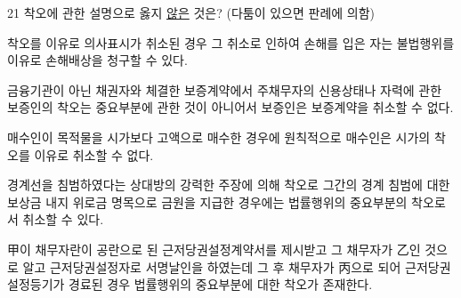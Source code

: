 \begin{question}{21}
착오에 관한 설명으로 옳지 \uline{않은} 것은? (다툼이 있으면 판례에 의함)
\begin{choices}
  \item 착오를 이유로 의사표시가 취소된 경우 그 취소로 인하여 손해를 입은 자는 불법행위를 이유로 손해배상을 청구할 수 있다.
  \item 금융기관이 아닌 채권자와 체결한 보증계약에서 주채무자의 신용상태나 자력에 관한 보증인의 착오는 중요부분에 관한 것이 아니어서 보증인은 보증계약을 취소할 수 없다.
  \item 매수인이 목적물을 시가보다 고액으로 매수한 경우에 원칙적으로 매수인은 시가의 착오를 이유로 취소할 수 없다.
  \item 경계선을 침범하였다는 상대방의 강력한 주장에 의해 착오로 그간의 경계 침범에 대한 보상금 내지 위로금 명목으로 금원을 지급한 경우에는 법률행위의 중요부분의 착오로서 취소할 수 있다.
  \item 甲이 채무자란이 공란으로 된 근저당권설정계약서를 제시받고 그 채무자가 乙인 것으로 알고 근저당권설정자로 서명날인을 하였는데 그 후 채무자가 丙으로 되어 근저당권설정등기가 경료된 경우 법률행위의 중요부분에 대한 착오가 존재한다.
\end{choices}
\end{question}
